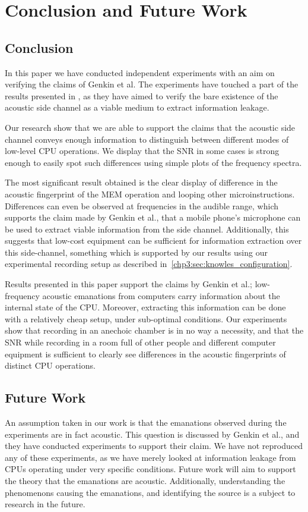 \chapter{Conclusion and Future Work}\label{chp7:conclusion}

\section{Conclusion}
In this paper we have conducted independent experiments with an aim on verifying the claims of Genkin et al. 
The experiments have touched a part of the results presented in \cite{DBLP:conf/crypto/GenkinST14}, as they have aimed to verify the bare existence of the acoustic side channel as a viable medium to extract information leakage.

Our research show that we are able to support the claims that the acoustic side channel conveys enough information to distinguish between different modes of low-level CPU operations.
We display that the \gls{SNR} in some cases is strong enough to easily spot such differences using simple plots of the frequency spectra.

The most significant result obtained is the clear display of difference in the acoustic fingerprint of the MEM operation and looping other microinstructions.
Differences can even be observed at frequencies in the audible range, which supports the claim made by Genkin et al., that a mobile phone's microphone can be used to extract viable information from the side channel.
Additionally, this suggests that low-cost equipment can be sufficient for information extraction over this side-channel, something which is supported by our results using our experimental recording setup as described in~\autoref{chp3:sec:knowles_configuration}.

Results presented in this paper support the claims by Genkin et al.; low-frequency acoustic emanations from computers carry information about the internal state of the \gls{CPU}.
Moreover, extracting this information can be done with a relatively cheap setup, under sub-optimal conditions.
Our experiments show that recording in an anechoic chamber is in no way a necessity, and that the \gls{SNR} while recording in a room full of other people and different computer equipment is sufficient to clearly see differences in the acoustic fingerprints of distinct \gls{CPU} operations.



\section{Future Work}\label{chp7:sec:future_work}
An assumption taken in our work is that the emanations observed during the experiments are in fact acoustic.
This question is discussed by Genkin et al., and they have conducted experiments to support their claim.
We have not reproduced any of these experiments, as we have merely looked at information leakage from CPUs operating under very specific conditions.
Future work will aim to support the theory that the emanations are acoustic.
Additionally, understanding the phenomenons causing the emanations, and identifying the source is a subject to research in the future.




